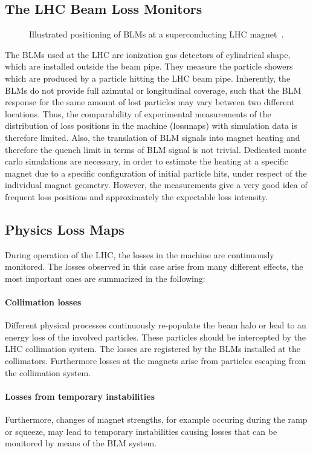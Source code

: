 \subsection{The LHC Beam Loss Monitors}
\begin{figure}[t]
  \centering
   \def\svgwidth{1.0\linewidth}
   
  \caption{Illustrated positioning of BLMs at a superconducting LHC magnet~\cite{dehning2002lhc}.}
\label{pic:14061701}
\end{figure}
%
The BLMs used at the LHC are ionization gas detectors of cylindrical shape, which are installed outside the beam pipe. They measure the particle showers which are produced by a particle hitting the LHC beam pipe.
Inherently, the BLMs do not provide full azimutal or longitudinal coverage, such that the BLM response for the same amount of lost particles may vary between two different locations. Thus, the comparability of experimental measurements of the distribution of loss positions in the machine (lossmaps) with simulation data is therefore limited. Also, the translation of BLM signals into magnet heating and therefore the quench limit in terms of BLM signal is not trivial. Dedicated monte carlo simulations are necessary, in order to estimate the heating at a specific magnet due to a specific configuration of initial particle hits, under respect of the individual magnet geometry. However, the measurements give a very good idea of frequent loss positions and approximately the expectable loss intensity. 


\subsection{Physics Loss Maps}

During operation of the LHC, the losses in the machine are continuously monitored. The losses observed in this case arise from many different effects, the most important ones are summarized in the following:
%
\paragraph{Collimation losses} Different physical processes continuously re-populate the beam halo or lead to an energy loss of the involved particles. These particles should be intercepted by the LHC collimation system. The losses are registered by the BLMs installed at the collimators. Furthermore losses at the magnets arise from particles escaping from the collimation system. 
%
\paragraph{Losses from temporary instabilities} Furthermore, changes of magnet strengths, for example occuring during the ramp or squeeze, may lead to temporary instabilities causing losses that can be monitored by means of the BLM system. 
%
